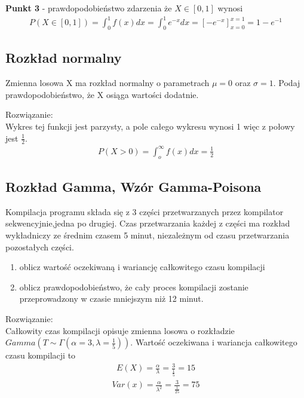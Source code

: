 \documentclass[main.tex]{subfiles}
\begin{document}
    \textbf{Punkt 3} - prawdopodobieństwo zdarzenia że $X \in [0,1]$ wynosi
    \begin{align*}
        P(X \in [0,1]) = \int_0^1 f(x) dx = \int_0^1 e^{-x} dx = [-e^{-x}]_{x=0}^{x=1} = 1 - e^{-1}
    \end{align*}


    \subsection{Rozkład normalny}
    \begin{exercise}
        Zmienna losowa X ma rozkład normalny o parametrach $\mu = 0$ oraz $\sigma = 1$. Podaj prawdopodobieństwo, że
        X osiąga wartości dodatnie.
    \end{exercise}
    Rozwiązanie:\\

    Wykres tej funkcji jest parzysty, a pole całego wykresu wynosi 1 więc z połowy jest $\frac{1}{2}$.
    \begin{align*}
        P(X > 0) =  \int_o^{\infty} f(x)dx = \frac{1}{2}
    \end{align*}

    \subsection{Rozkład Gamma, Wzór Gamma-Poisona}
    \begin{exercise}
        Kompilacja programu składa się z 3 części przetwarzanych przez kompilator sekwencyjnie,jedna po drugiej.
        Czas przetwarzania każdej z części ma rozkład wykładniczy ze średnim czasem 5 minut, niezależnym od
        czasu przetwarzania pozostałych części.
        \begin{enumerate}
            \item oblicz wartość oczekiwaną i wariancję całkowitego czasu kompilacji
            \item oblicz prawdopodobieństwo, że cały proces kompilacji zostanie przeprowadzony w
            czasie mniejszym niż 12 minut.
        \end{enumerate}
    \end{exercise}
    Rozwiązanie:\\

    Całkowity czas kompilacji opisuje zmienna losowa o rozkładzie $Gamma\left(T \sim \Gamma\left(\alpha = 3, \lambda = \frac{1}{5}\right)\right)$.
    Wartość oczekiwana i wariancja całkowitego czasu kompilacji to
    \begin{align*}
        E(X) = \frac{\alpha}{\lambda} = \frac{3}{\frac{1}{5}} = 15
    \end{align*}
    \begin{align*}
        Var(x) = \frac{\alpha}{\lambda^2} = \frac{3}{\frac{1}{25}}= 75
    \end{align*}
\end{document}
